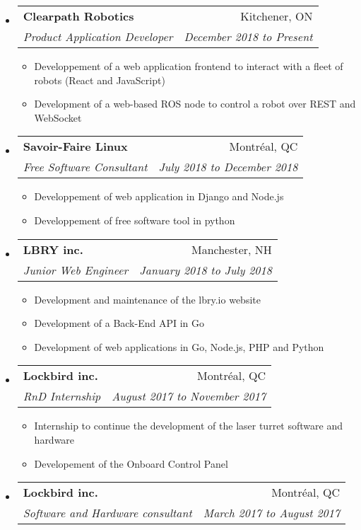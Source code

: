 \documentclass[letterpaper,11pt]{article}
\makeatletter
\newcommand{\ressubheading}[4]{
	\begin{tabular*}{6.5in}{l@{\cftdotfill{\cftsecdotsep}\extracolsep{\fill}}r}
		\textbf{#1} & #2 \\
		\textit{#3} & \textit{#4} \\
	\end{tabular*}\vspace{-6pt}}
\makeatother
\begin{document}
	\begin{itemize}
		
		\item
			\ressubheading{Clearpath Robotics}{Kitchener, ON}{Product Application Developer }{December 2018 to Present}
			\begin{itemize}
				\item Developpement of a web application frontend to interact with a fleet of robots (React and JavaScript)
				\item Development of a web-based ROS node to control a robot over REST and WebSocket
			\end{itemize}
		\item
			\ressubheading{Savoir-Faire Linux}{Montréal, QC}{Free Software Consultant}{July 2018 to December 2018}
			
			\begin{itemize}
				\item Developpement of web application in Django and Node.js 
				\item Developpement of free software tool in python
			\end{itemize}
		
		\item
			\ressubheading{LBRY inc.}{Manchester, NH}{Junior Web Engineer}{January 2018 to July 2018}
			
			\begin{itemize}
				\item Development and maintenance of the lbry.io website
				\item Development of a Back-End API in Go
				\item Development of web applications in Go, Node.js, PHP and Python
			\end{itemize}
		
		\item 
			\ressubheading{Lockbird inc.}{Montréal, QC}{RnD Internship}{August 2017 to November 2017}
			
			\begin{itemize}
				\item Internship to continue the development of the laser turret software and hardware
				\item  Developement of the Onboard Control Panel
			\end{itemize}
			
		\item
			\ressubheading{Lockbird inc.}{Montréal, QC}{Software and Hardware consultant}{March 2017 to August 2017}
			

\end{itemize}
\end{document}
